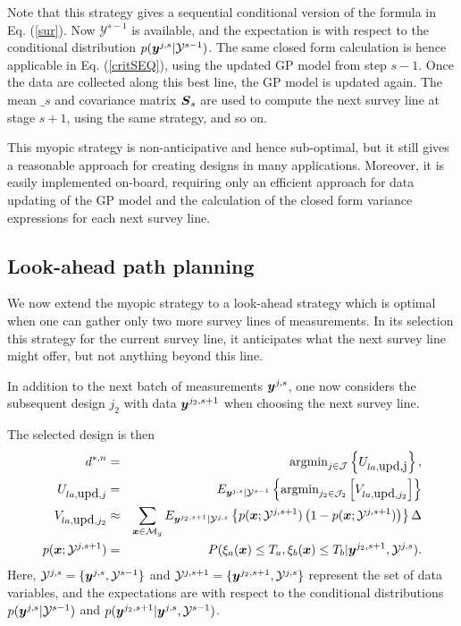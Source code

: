 \documentclass[aoas]{imsart}
\begin{document}
Note that this strategy gives a sequential conditional version of the formula in Eq. (\ref{sur}). Now $\mathcal{Y}^{s-1}$ is available, and the expectation is with respect to the conditional distribution $p({\boldsymbol y}^{j,s}|\mathcal{Y}^{s-1})$. The same closed form calculation is hence applicable in Eq. (\ref{critSEQ}), using the updated GP model from step $s-1$. 
Once the data are collected along this best line, the GP model is updated again. The mean $\bm_{s}$ and covariance matrix ${\boldsymbol S}_{s}$ are used to compute the next survey line at stage $s+1$, using the same strategy, and so on. 

This myopic strategy is non-anticipative and hence sub-optimal, but it still gives a reasonable approach for creating designs in many applications. Moreover, it is easily implemented on-board, requiring only an efficient approach for data updating of the GP model and the calculation of the closed form variance expressions for each next survey line. 


\subsection{Look-ahead path planning}
\label{LA}

We now extend the myopic strategy to a look-ahead strategy which is optimal when one can gather only two more survey lines of measurements. In its selection this strategy for the current survey line, it anticipates what the next survey line might offer, but not anything beyond this line. 

In addition to the next batch of measurements ${\boldsymbol y}^{j,s}$, one now considers the subsequent design $j_2$ with data ${\boldsymbol y}^{j_2,s+1}$ when choosing the next survey line. 

The selected design is then
\begin{eqnarray}\label{critLA}
    d^{*,n} &=& \mbox{argmin}_{j \in \mathcal{J}} \left\{ U_{la,\mbox{upd,j}} \right\},  \\
    U_{la,\mbox{upd},j} & = &  E_{\by^{j,s}|\mathcal{Y}^{s-1}} \left\{ \mbox{argmin}_{j_2 \in \mathcal{J}_2} \left[ V_{la,\mbox{upd},j_2} \right] \right\} \nonumber \\
V_{la,\mbox{upd},j_2} & \approx & \sum_{\bx \in \mathcal{M}_g} E_{\by^{j_2,s+1}|\mathcal{Y}^{j,s}} \left\{ p(\bx;\mathcal{Y}^{j,s+1})\left( 1-p(\bx;\mathcal{Y}^{j,s+1})\right) \right\} \Delta \nonumber \\
    p(\bx;\mathcal{Y}^{j,s+1}) &=& P(\xi_a(\bx) \leq T_a, \xi_b(\bx) \leq T_b |\by^{j_2,s+1},\mathcal{Y}^{j,s}). \nonumber
\end{eqnarray}
Here, $\mathcal{Y}^{j,s}=\{{\boldsymbol y}^{j,s},\mathcal{Y}^{s-1}\}$ and $\mathcal{Y}^{j,s+1}=\{{\boldsymbol y}^{j_2,s+1},\mathcal{Y}^{j,s}\}$ represent the set of data variables, and the expectations are with respect to the conditional distributions $p({\boldsymbol y}^{j,s}|\mathcal{Y}^{s-1})$ and $p({\boldsymbol y}^{j_2,s+1}|{\boldsymbol y}^{j,s},\mathcal{Y}^{s-1})$. 
\end{document}

